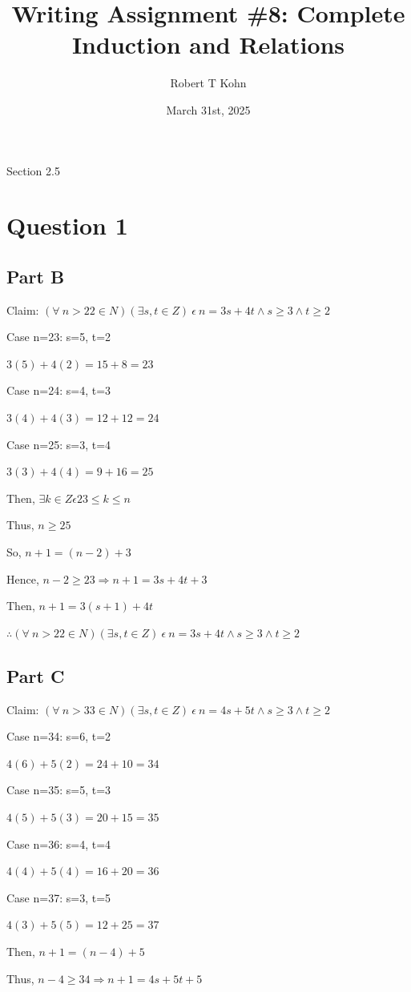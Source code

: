 \documentclass{article}
\title{Writing Assignment \#8: Complete Induction and Relations}
\author{Robert T Kohn}
\date{March 31st, 2025}
\begin{document}
\maketitle

{\huge{Section 2.5}}
\section*{Question 1}
\subsection*{Part B}

Claim: $(\forall \ n>22 \in N) (\exists s, t \in Z) \ \epsilon \ n=3s+4t \wedge s \geq 3 \wedge t \geq 2$

Case n=23: s=5, t=2

$3(5)+4(2)=15+8=23$

Case n=24: s=4, t=3

$3(4)+4(3)=12+12=24$

Case n=25: s=3, t=4

$3(3)+4(4)=9+16=25$

Then, $\exists k \in Z \epsilon 23 \leq k \leq n$ 

Thus,  $n \geq 25$

So, $n+1=(n-2)+3$

Hence, $n-2\geq  23 \Rightarrow n+1=3s+4t+3$

Then, $n+1=3(s+1)+4t$

$\therefore (\forall \ n>22 \in N) (\exists s, t \in Z) \ \epsilon \ n=3s+4t \wedge s \geq 3 \wedge t \geq 2$

\subsection*{Part C}

Claim: $(\forall \ n>33 \in N) (\exists s, t \in Z) \ \epsilon \ n=4s+5t \wedge s \geq 3 \wedge t \geq 2$

Case n=34: s=6, t=2

$4(6)+5(2)=24+10=34$

Case n=35: s=5, t=3

$4(5)+5(3)=20+15=35$

Case n=36: s=4, t=4

$4(4)+5(4)=16+20=36$

Case n=37: s=3, t=5

$4(3)+5(5)=12+25=37$

Then, $n+1=(n-4)+5$

Thus, $n-4 \geq 34 \Rightarrow n+1=4s+5t+5$
\end{document}
